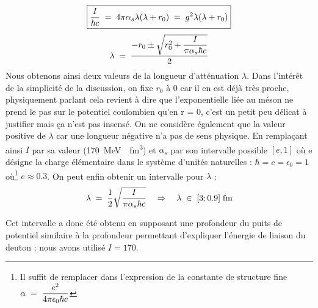 \[
    \boxed{
        \dfrac{I} {\hbar c}\eq 4\pi \alpha_s \lambda(\lambda + r_0)
        \eq g^2\lambda(\lambda + r_0)}
\]
\[
    \lambda \eq \dfrac{-r_0 \pm \sqrt{r_0^2 + \dfrac{I}{\pi\alpha_s\hbar c}}}{2}
\]
Nous obtenons ainsi deux valeurs de la longueur d'atténuation $\lambda$. Dans l'intérêt de la simplicité de la discussion, on fixe $r_0$ à 0 car il en est déjà très proche, physiquement parlant cela revient à dire que l'exponentielle liée au méson ne prend le pas sur le potentiel coulombien qu'en r = 0, c'est un petit peu délicat à justifier mais ça n'est pas insensé. On ne considère également que la valeur positive de $\lambda$ car une longueur négative n'a pas de sens physique. En remplaçant ainsi $I$ par sa valeur (\SI{170}{MeV \cdot fm^3}) et $\alpha_s$ par son intervalle possible $[e,1]$ où e désigne la charge élémentaire dans le système d'unités naturelles : $\hbar = c = \epsilon_0 = 1$ où\footnote{Il suffit de remplacer dans l'expression de la constante de structure fine $\alpha \eq \dfrac{e^2}{4\pi\epsilon_0 \hbar c}$} $e \approx 0.3$. On peut enfin obtenir un intervalle pour $\lambda$ :
\[
    \lambda \eq \dfrac{1}{2} \sqrt{\dfrac{I}{\pi\alpha_s\hbar c}}
    \quad \Rightarrow \quad
    \lambda \;\in\; [3;0.9]\; \si{fm}
\]

Cet intervalle a donc été obtenu en supposant une profondeur du puits de potentiel similaire à la profondeur permettant d'expliquer l'énergie de liaison du deuton : nous avons utilisé $I=170$.\\

